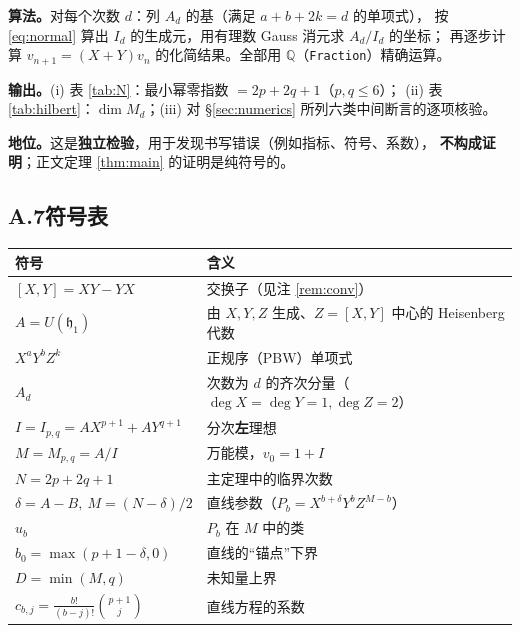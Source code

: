 \documentclass[11pt,UTF8]{ctexart}
\theoremstyle{definition}
\newcommand{\Q}{\mathbb{Q}}
\newcommand{\hh}{\mathfrak{h}}
\begin{document}
\noindent\textbf{算法。}对每个次数 $d$：列 $A_d$ 的基（满足 $a+b+2k=d$ 的单项式），
按 \eqref{eq:normal} 算出 $I_d$ 的生成元，用有理数 Gauss 消元求 $A_d/I_d$ 的坐标；
再逐步计算 $v_{n+1}=(X+Y)v_n$ 的化简结果。全部用 $\Q$（\texttt{Fraction}）精确运算。

\noindent\textbf{输出。}(i) 表 \ref{tab:N}：最小幂零指数 $=2p+2q+1$（$p,q\le6$）；
(ii) 表 \ref{tab:hilbert}：$\dim M_d$；(iii) 对 \S\ref{sec:numerics} 所列六类中间断言的逐项核验。

\noindent\textbf{地位。}这是\textbf{独立检验}，用于发现书写错误（例如指标、符号、系数），
\textbf{不构成证明}；正文定理 \ref{thm:main} 的证明是纯符号的。

\subsection*{A.7\quad 符号表}

\begin{center}
\begin{tabular}{ll}
\toprule
符号 & 含义\\
\midrule
$[X,Y]=XY-YX$ & 交换子（见注 \ref{rem:conv}）\\
$A=U(\hh_1)$ & 由 $X,Y,Z$ 生成、$Z=[X,Y]$ 中心的 Heisenberg 代数\\
$X^aY^bZ^k$ & 正规序（PBW）单项式\\
$A_d$ & 次数为 $d$ 的齐次分量（$\deg X=\deg Y=1,\deg Z=2$）\\
$I=I_{p,q}=AX^{p+1}+AY^{q+1}$ & 分次\textbf{左}理想\\
$M=M_{p,q}=A/I$ & 万能模，$v_0=1+I$\\
$N=2p+2q+1$ & 主定理中的临界次数\\
$\delta=A-B,\ M=(N-\delta)/2$ & 直线参数（$P_b=X^{b+\delta}Y^bZ^{M-b}$）\\
$u_b$ & $P_b$ 在 $M$ 中的类\\
$b_0=\max(p+1-\delta,0)$ & 直线的“锚点”下界\\
$D=\min(M,q)$ & 未知量上界\\
$c_{b,j}=\frac{b!}{(b-j)!}\binom{p+1}{j}$ & 直线方程的系数\\
\bottomrule
\end{tabular}
\end{center}
\end{document}
